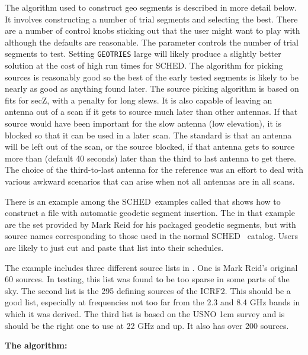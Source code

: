 \documentclass{report}
\newcommand{\sched}{{\sc SCHED}}
\newcommand{\schedb}{{\sc SCHED~}}
\begin{document}
The algorithm used to construct geo segments is described in more
detail below.  It involves constructing a number of trial segments and
selecting the best.  There are a number of control knobs sticking out
that the user might want to play with although the defaults are
reasonable.  The parameter 
controls the number of trial segments to test.  Setting {\tt GEOTRIES}
large will likely produce a slightly better solution at the cost of
high run times for \sched.  The algorithm for picking sources is
reasonably good so the best of the early tested segments is likely to
be nearly as good as anything found later.  The source picking
algorithm is based on fits for secZ, with a penalty for long slews.
It is also capable of leaving an antenna out of a scan if it gets to
source much later than other antennas.  If that source would have been
important for the slow antenna (low elevation), it is blocked so that
it can be used in a later scan.  The standard is that an antenna will
be left out of the scan, or the source blocked, if that antenna gets
to source more than  (default 40
seconds) later than the third to last antenna to get there.  The
choice of the third-to-last antenna for the reference was an effort to
deal with various awkward scenarios that can arise when not all
antennas are in all scans.

There is an example among the \schedb examples called
 that shows
how to construct a file with automatic geodetic segment insertion.
The  in that example are the set
provided by Mark Reid for his packaged geodetic segments, but with
source names corresponding to those used in the normal \schedb
catalog.  Users are likely to just cut and paste that list into their
schedules.

The example 
includes three different source lists in .
One is Mark Reid's original 60 sources.  In testing, this list was found
to be too sparse in some parts of the sky.  The second list is the
295 defining sources of the ICRF2.  This should be a good list, especially
at frequencies not too far from the 2.3 and 8.4 GHz bands in which it
was derived.  The third list is based on the USNO 1cm survey and is
should be the right one to use at 22 GHz and up.  It also has over 200
sources.

{\bf The algorithm:}
\end{document}
